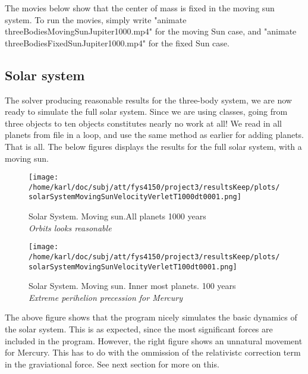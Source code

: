 \documentclass{article}
\begin{document}
The movies below show that the center of mass is fixed in the moving sun system. To run the movies, simply write "animate threeBodiesMovingSunJupiter1000.mp4" for the moving Sun case, and "animate threeBodiesFixedSunJupiter1000.mp4" for the fixed Sun case.




\subsection{Solar system}
The solver producing reasonable results for the three-body system, we are now ready to simulate the full solar system. Since we are using classes, going from three objects to ten objects constitutes nearly no work at all! We read in all planets from file in a loop, and use the same method as earlier for adding planets. That is all. The below figures displays the results for the full solar system, with a moving sun. \\


\begin{minipage}{.45\textwidth} 
	\begin{figure}[H]
		\centering
		\texttt{[image: /home/karl/doc/subj/att/fys4150/project3/resultsKeep/plots/solarSystemMovingSunVelocityVerletT1000dt0001.png]}
		\caption{Solar System. Moving sun.All planets 1000 years  \\ \textit{Orbits looks reasonable}}
		\label{1}
	\end{figure}
\end{minipage}\hfill
\begin{minipage}{.45\textwidth} 
	\begin{figure}[H]
		\centering
		\texttt{[image: /home/karl/doc/subj/att/fys4150/project3/resultsKeep/plots/solarSystemMovingSunVelocityVerletT100dt0001.png]}
		\caption{Solar System. Moving sun. Inner most planets. 100 years  \\ \textit{Extreme perihelion precession for Mercury}}
		\label{1}
	\end{figure}
\end{minipage}\hfill
\vspace{2ex}



The above figure shows that the program nicely simulates the basic dynamics of the solar system. This is as expected, since the most significant forces are included in the program. However, the right figure shows an unnatural movement for Mercury. This has to do with the ommission of the relativistc correction term in the graviational force. See next section for more on this.
\end{document}
